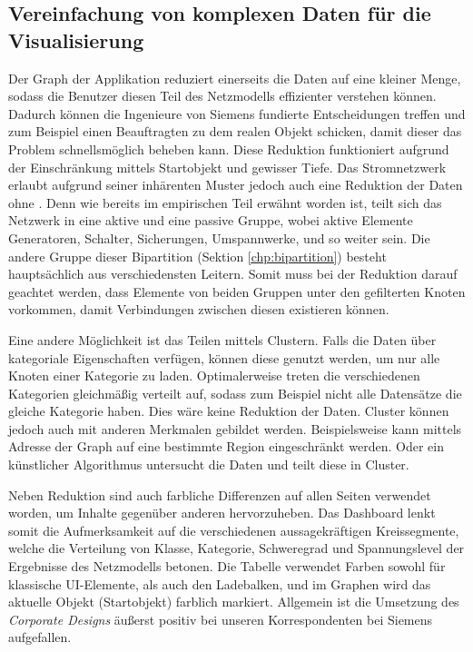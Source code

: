 \subsection{Vereinfachung von komplexen Daten für die Visualisierung}

Der Graph der Applikation reduziert einerseits die Daten auf eine kleiner Menge, sodass die Benutzer diesen Teil des Netzmodells effizienter verstehen können. Dadurch können die Ingenieure von Siemens fundierte Entscheidungen treffen und zum Beispiel einen Beauftragten zu dem realen Objekt schicken, damit dieser das Problem schnellsmöglich beheben kann. Diese Reduktion funktioniert aufgrund der Einschränkung mittels Startobjekt und gewisser Tiefe. Das Stromnetzwerk erlaubt aufgrund seiner inhärenten Muster jedoch auch eine Reduktion der Daten ohne . Denn wie bereits im empirischen Teil erwähnt worden ist, teilt sich das Netzwerk in eine aktive und eine passive Gruppe, wobei aktive Elemente Generatoren, Schalter, Sicherungen, Umspannwerke, und so weiter sein. Die andere Gruppe dieser Bipartition (Sektion \ref{chp:bipartition}) besteht hauptsächlich aus verschiedensten Leitern. Somit muss bei der Reduktion darauf geachtet werden, dass Elemente von beiden Gruppen unter den gefilterten Knoten vorkommen, damit Verbindungen zwischen diesen existieren können.

Eine andere Möglichkeit ist das Teilen mittels Clustern. Falls die Daten über kategoriale Eigenschaften verfügen, können diese genutzt werden, um nur alle Knoten einer Kategorie zu laden. Optimalerweise treten die verschiedenen Kategorien gleichmäßig verteilt auf, sodass zum Beispiel nicht alle Datensätze die gleiche Kategorie haben. Dies wäre keine Reduktion der Daten. Cluster können jedoch auch mit anderen Merkmalen gebildet werden. Beispielsweise kann mittels Adresse der Graph auf eine bestimmte Region eingeschränkt werden. Oder ein künstlicher Algorithmus untersucht die Daten und teilt diese in Cluster.

Neben Reduktion sind auch farbliche Differenzen auf allen Seiten verwendet worden, um Inhalte gegenüber anderen hervorzuheben. Das Dashboard lenkt somit die Aufmerksamkeit auf die verschiedenen aussagekräftigen Kreissegmente, welche die Verteilung von Klasse, Kategorie, Schweregrad und Spannungslevel der Ergebnisse des Netzmodells betonen. Die Tabelle verwendet Farben sowohl für klassische UI-Elemente, als auch den Ladebalken, und im Graphen wird das aktuelle Objekt (Startobjekt) farblich markiert. Allgemein ist die Umsetzung des \emph{Corporate Designs} äußerst positiv bei unseren Korrespondenten bei Siemens aufgefallen.

